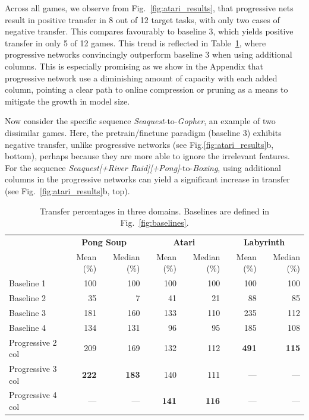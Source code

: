 \documentclass{article}
\begin{document}
Across all games, we observe from Fig.~\ref{fig:atari_results},
that progressive nets result in
positive transfer in 8 out of 12 target tasks, with only two cases
of negative transfer. This compares favourably to baseline 3, which yields
positive transfer in only 5 of 12 games. This trend is reflected in
Table~\ref{table:main}, where progressive networks convincingly outperform
baseline 3 when using additional columns. This is especially promising as
we show in the Appendix that progressive network use a diminishing amount of
capacity with each added column, pointing a clear path to online compression
or pruning as a means to mitigate the growth in model size.

Now consider the specific sequence
\textit{Seaquest}-to-\textit{Gopher}, an example of two dissimilar games. Here, the
pretrain/finetune paradigm (baseline 3) exhibits negative transfer, unlike
progressive networks (see Fig.\ref{fig:atari_results}b, bottom), perhaps
because they are more able to ignore the irrelevant features. For the sequence
\textit{Seaquest[+River Raid][+Pong]}-to-\textit{Boxing}, using additional
columns in the progressive networks can yield a significant increase in
transfer (see Fig.~\ref{fig:atari_results}b, top).

\begin{table}[t]
\begin{center}
\small
\begin{tabular}{@{}lrrrrrr@{}}
 \toprule
& \multicolumn{2}{c}{\textbf{Pong Soup}}
& \multicolumn{2}{c}{\textbf{Atari}}
& \multicolumn{2}{c}{\textbf{Labyrinth}}\\
                    & Mean (\%)    & Median (\%)  & Mean (\%)    & Median (\%)  & Mean (\%)     & Median (\%)  \\
 \midrule
  Baseline 1        & 100          & 100          & 100          & 100          & 100           & 100          \\
  Baseline 2        & 35           & 7            & 41           & 21           & 88            & 85           \\
  Baseline 3        & 181          & 160          & 133          & 110          & 235           & 112          \\
  Baseline 4        & 134          & 131          & 96           & 95           & 185           & 108          \\
  Progressive 2 col & 209          & 169          & 132          & 112          & \textbf{491}  & \textbf{115} \\
  Progressive 3 col & \textbf{222} & \textbf{183} & 140          & 111          & ---           & ---          \\
  Progressive 4 col & ---          & ---          & \textbf{141} & \textbf{116} & ---           & ---          \\

 \bottomrule
\end{tabular}
\end{center}
\caption{Transfer percentages in three domains. Baselines are defined in
    Fig.~\ref{fig:baselines}.}
\label{table:main}
\end{table}
\end{document}
